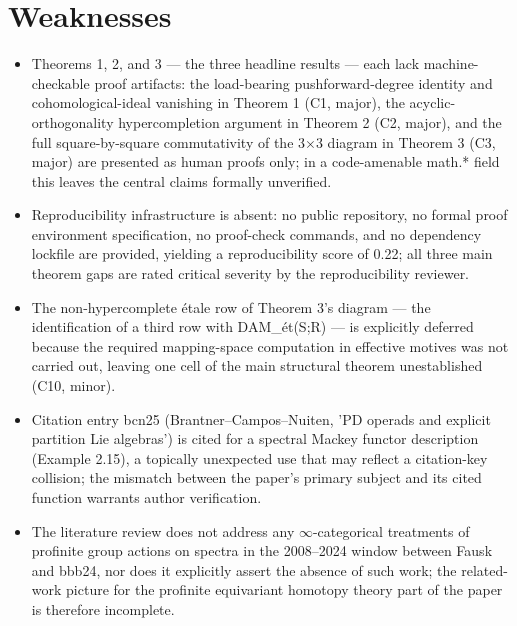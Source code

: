 \documentclass[11pt]{article}
\begin{document}
\section*{Weaknesses}
\begin{itemize}[leftmargin=*]
  \item Theorems 1, 2, and 3 --- the three headline results --- each lack machine-checkable proof artifacts: the load-bearing pushforward-degree identity and cohomological-ideal vanishing in Theorem 1 (C1, major), the acyclic-orthogonality hypercompletion argument in Theorem 2 (C2, major), and the full square-by-square commutativity of the 3\ensuremath{\times}3 diagram in Theorem 3 (C3, major) are presented as human proofs only; in a code-amenable math.* field this leaves the central claims formally unverified.
  \item Reproducibility infrastructure is absent: no public repository, no formal proof environment specification, no proof-check commands, and no dependency lockfile are provided, yielding a reproducibility score of 0.22; all three main theorem gaps are rated critical severity by the reproducibility reviewer.
  \item The non-hypercomplete étale row of Theorem 3's diagram --- the identification of a third row with DAM\_ét(S;R) --- is explicitly deferred because the required mapping-space computation in effective motives was not carried out, leaving one cell of the main structural theorem unestablished (C10, minor).
  \item Citation entry bcn25 (Brantner--Campos--Nuiten, 'PD operads and explicit partition Lie algebras') is cited for a spectral Mackey functor description (Example 2.15), a topically unexpected use that may reflect a citation-key collision; the mismatch between the paper's primary subject and its cited function warrants author verification.
  \item The literature review does not address any \ensuremath{\infty}-categorical treatments of profinite group actions on spectra in the 2008--2024 window between Fausk and bbb24, nor does it explicitly assert the absence of such work; the related-work picture for the profinite equivariant homotopy theory part of the paper is therefore incomplete.
\end{itemize}
\end{document}
